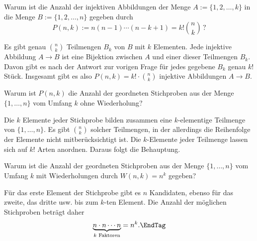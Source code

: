 \begin{frage}
  Warum ist die Anzahl der injektiven Abbildungen der Menge 
  $A:=\{ 1,2,\ldots,k\}$ 
  in die Menge $B:=\{ 1,2,\ldots,n \}$ 
  gegeben durch 
  \[
  P(n,k):=n(n-1)\cdots (n-k+1) = k! \binom{n}{k}\,\text{?}
  \]
\end{frage}

\begin{antwort}
  Es gibt genau $\binom{n}{k}$ Teilmengen $B_k$ von $B$ mit 
  $k$ Elementen. 
  Jede injektive Abbildung $A \to B$ ist eine Bijektion 
  zwischen $A$ und einer dieser Teilmengen $B_k$. Davon gibt es nach der 
  Antwort zur vorigen Frage für jedes gegebene $B_k$ genau $k!$ Stück.  
  Insgesamt gibt es also $P(n,k)=k! \cdot \binom{n}{k}$ injektive 
  Abbildungen $A\to B$.
  \AntEnd
\end{antwort}


\begin{frage}
  Warum ist $P(n,k)$ die Anzahl der geordneten Stichproben aus der  
  Menge $\{ 1, \ldots, n \}$ vom Umfang $k$ ohne Wiederholung?
\end{frage}

\begin{antwort}
  Die $k$ Elemente jeder Stichprobe bilden zusammen eine 
  $k$-elementige Teilmenge von $\{ 1,\ldots, n\}$. Es gibt 
  $\binom{n}{k}$ solcher Teilmengen, in der allerdings die Reihenfolge der 
  Elemente nicht mitberücksichtigt ist. 
  Die $k$-Elemente jeder Teilmenge lassen sich auf $k!$ Arten anordnen. 
  Daraus folgt die Behauptung.
  \AntEnd
\end{antwort}






\begin{frage}
  Warum ist die Anzahl der geordneten Stichproben aus der Menge 
  $\{ 1,\ldots, n \} $ vom Umfang $k$ mit Wiederholungen durch 
  $W(n,k)=n^k$ gegeben?
\end{frage}

\begin{antwort}
  Für das erste Element der Stichprobe gibt es $n$ Kandidaten,  
  ebenso für das zweite, das dritte usw. bis zum $k$-ten Element. 
  Die Anzahl der möglichen Stichproben beträgt daher
  \[
  \underbrace{ n\cdot n \cdots n }_{\text{$k$ Faktoren}} = n^k.\EndTag
  \]
\end{antwort}






